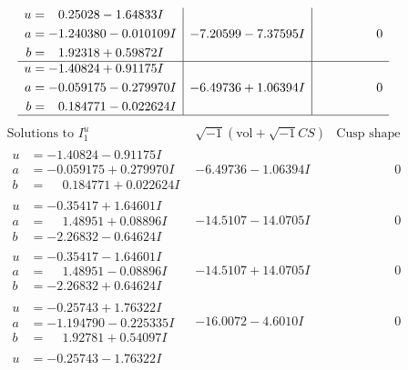 \documentclass[1p]{elsarticle_modified}
\theoremstyle{definition}
\newcommand{\I}{\sqrt{-1}}
\begin{document}
$$\begin{array}{c|c|c}
\begin{aligned}
u &= \phantom{-}0.25028 - 1.64833 I \\
a &= -1.240380 - 0.010109 I \\
b &= \phantom{-}1.92318 + 0.59872 I\end{aligned}
 & -7.20599 - 7.37595 I & \phantom{-0.000000 } 0 \\ \hline\begin{aligned}
u &= -1.40824 + 0.91175 I \\
a &= -0.059175 - 0.279970 I \\
b &= \phantom{-}0.184771 - 0.022624 I\end{aligned}
 & -6.49736 + 1.06394 I & \phantom{-0.000000 } 0\\
 \hline 
 \end{array}$$\newpage$$\begin{array}{c|c|c}  
\text{Solutions to }I^u_{1}& \I (\text{vol} + \sqrt{-1}CS) & \text{Cusp shape}\\
 \hline 
\begin{aligned}
u &= -1.40824 - 0.91175 I \\
a &= -0.059175 + 0.279970 I \\
b &= \phantom{-}0.184771 + 0.022624 I\end{aligned}
 & -6.49736 - 1.06394 I & \phantom{-0.000000 } 0 \\ \hline\begin{aligned}
u &= -0.35417 + 1.64601 I \\
a &= \phantom{-}1.48951 + 0.08896 I \\
b &= -2.26832 - 0.64624 I\end{aligned}
 & -14.5107 - 14.0705 I & \phantom{-0.000000 } 0 \\ \hline\begin{aligned}
u &= -0.35417 - 1.64601 I \\
a &= \phantom{-}1.48951 - 0.08896 I \\
b &= -2.26832 + 0.64624 I\end{aligned}
 & -14.5107 + 14.0705 I & \phantom{-0.000000 } 0 \\ \hline\begin{aligned}
u &= -0.25743 + 1.76322 I \\
a &= -1.194790 - 0.225335 I \\
b &= \phantom{-}1.92781 + 0.54097 I\end{aligned}
 & -16.0072 - 4.6010 I & \phantom{-0.000000 } 0 \\ \hline\begin{aligned}
u &= -0.25743 - 1.76322 I \\

\end{aligned}
\end{array}$$
\end{document}
